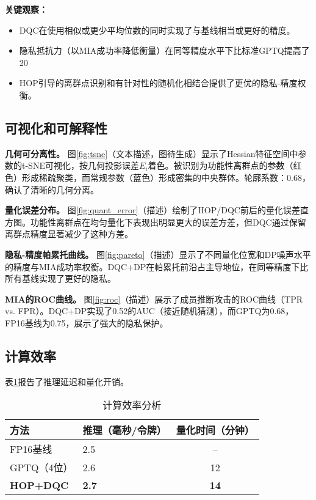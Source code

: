 \documentclass[letterpaper,twocolumn,10pt]{article}
\begin{document}
\textbf{关键观察：}
\begin{itemize}
\item DQC在使用相似或更少平均位数的同时实现了与基线相当或更好的精度。
\item 隐私抵抗力（以MIA成功率降低衡量）在同等精度水平下比标准GPTQ提高了20%
\item HOP引导的离群点识别和有针对性的随机化相结合提供了更优的隐私-精度权衡。
\end{itemize}

\subsection{可视化和可解释性}

\textbf{几何可分离性。} 图\ref{fig:tsne}（文本描述，图待生成）显示了Hessian特征空间中参数的t-SNE可视化，按几何投影误差$E_i$着色。被识别为功能性离群点的参数（红色）形成稀疏聚类，而常规参数（蓝色）形成密集的中央群体。轮廓系数：0.68，确认了清晰的几何分离。

\textbf{量化误差分布。} 图\ref{fig:quant_error}（描述）绘制了HOP/DQC前后的量化误差直方图。功能性离群点在均匀量化下表现出明显更大的误差方差，但DQC通过保留离群点精度显著减少了这种方差。

\textbf{隐私-精度帕累托曲线。} 图\ref{fig:pareto}（描述）显示了不同量化位宽和DP噪声水平的精度与MIA成功率权衡。DQC+DP在帕累托前沿占主导地位，在同等精度下比所有基线实现了更好的隐私。

\textbf{MIA的ROC曲线。} 图\ref{fig:roc}（描述）展示了成员推断攻击的ROC曲线（TPR vs. FPR）。DQC+DP实现了0.52的AUC（接近随机猜测），而GPTQ为0.68，FP16基线为0.75，展示了强大的隐私保护。

\subsection{计算效率}

表\ref{tab:efficiency}报告了推理延迟和量化开销。

\begin{table}[t]
\centering
\caption{计算效率分析}
\label{tab:efficiency}
\tiny
\begin{tabular}{llc}
\hline
方法 & 推理（毫秒/令牌） & 量化时间（分钟） \\
\hline
FP16基线 & 2.5 & -- \\
GPTQ（4位） & 2.6 & 12 \\
\textbf{HOP+DQC} & \textbf{2.7} & \textbf{14} \\
\hline
\end{tabular}
\end{table}
\end{document}
